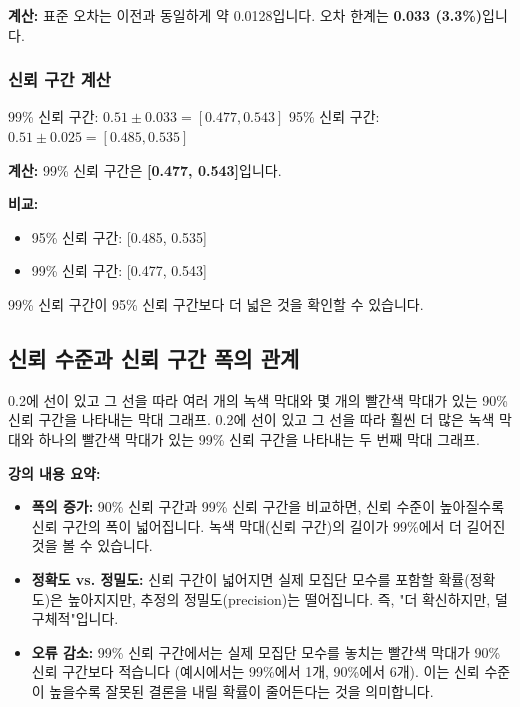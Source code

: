 \documentclass[11pt,a4paper]{article}
\theoremstyle{definition}
\begin{document}
\textbf{계산:}
표준 오차는 이전과 동일하게 약 0.0128입니다.
오차 한계는 \textbf{0.033 (3.3\%)}입니다.

\subsubsection{신뢰 구간 계산}

\begin{tcolorbox}[title=슬라이드 78: 연습 - 풀이]
99\% 신뢰 구간: $0.51 \pm 0.033 = [0.477, 0.543]$
95\% 신뢰 구간: $0.51 \pm 0.025 = [0.485, 0.535]$
\end{tcolorbox}

\textbf{계산:}
99\% 신뢰 구간은 \textbf{[0.477, 0.543]}입니다.

\textbf{비교:}
\begin{itemize}
    \item 95\% 신뢰 구간: [0.485, 0.535]
    \item 99\% 신뢰 구간: [0.477, 0.543]
\end{itemize}
99\% 신뢰 구간이 95\% 신뢰 구간보다 더 넓은 것을 확인할 수 있습니다.

\subsection{신뢰 수준과 신뢰 구간 폭의 관계}

\begin{tcolorbox}[title=슬라이드 79: 90\% 신뢰 구간 vs. 99\% 신뢰 구간]
0.2에 선이 있고 그 선을 따라 여러 개의 녹색 막대와 몇 개의 빨간색 막대가 있는 90\% 신뢰 구간을 나타내는 막대 그래프. 0.2에 선이 있고 그 선을 따라 훨씬 더 많은 녹색 막대와 하나의 빨간색 막대가 있는 99\% 신뢰 구간을 나타내는 두 번째 막대 그래프.
\end{tcolorbox}

\textbf{강의 내용 요약:}
\begin{itemize}
    \item \textbf{폭의 증가:} 90\% 신뢰 구간과 99\% 신뢰 구간을 비교하면, 신뢰 수준이 높아질수록 신뢰 구간의 폭이 넓어집니다. 녹색 막대(신뢰 구간)의 길이가 99\%에서 더 길어진 것을 볼 수 있습니다.
    \item \textbf{정확도 vs. 정밀도:} 신뢰 구간이 넓어지면 실제 모집단 모수를 포함할 확률(정확도)은 높아지지만, 추정의 정밀도(precision)는 떨어집니다. 즉, "더 확신하지만, 덜 구체적"입니다.
    \item \textbf{오류 감소:} 99\% 신뢰 구간에서는 실제 모집단 모수를 놓치는 빨간색 막대가 90\% 신뢰 구간보다 적습니다 (예시에서는 99\%에서 1개, 90\%에서 6개). 이는 신뢰 수준이 높을수록 잘못된 결론을 내릴 확률이 줄어든다는 것을 의미합니다.
\end{itemize}
\end{document}

